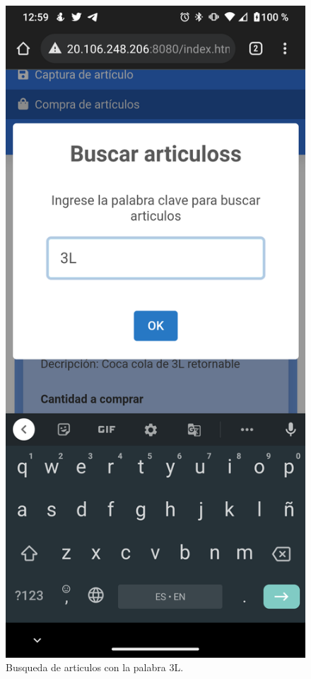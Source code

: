 \documentclass[11pt]{article}
\begin{document}
		\begin{figure}[H]
			\centering
			\includegraphics[scale=0.27]{resources/Screenshot_20211113-005920.png}
			\caption{Busqueda de articulos con la palabra 3L.}\label{fig:picture}
		\end{figure}
\end{document}
